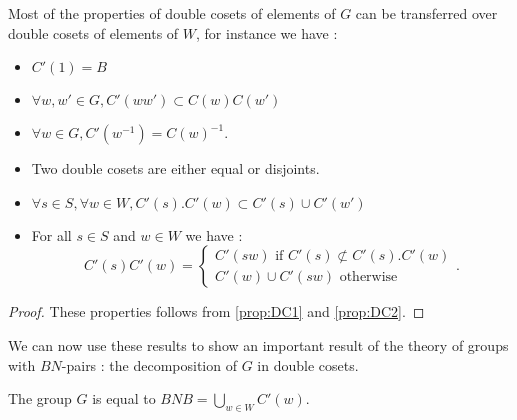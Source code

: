 Most of the properties of double cosets of elements of $G$ can be transferred over double cosets of elements of $W$, for instance we have : 

\begin{proprietes} \label{prop:DC3}
    \begin{itemize}
        \item  $C'\left( 1 \right) = B$
        \item $\forall w,w'\in G, C'\left( w w' \right) \subset C(w) C(w')$
        \item $\forall w \in G, C'\left( w^{-1} \right) = C\left( w \right)^{-1}$.
        \item Two double cosets are either equal or disjoints.
\item $\forall s \in S, \forall w \in W, C'(s). C'(w) \subset C'(s) \cup  C'(w')$
\item For all $s \in S$ and $w \in W$ we have :
     \[
     C'(s) C'(w) = \begin{cases}
         C'(sw) \text{ if } C'(s) \not \subset C'(s).C'(w)\\
         C'(w) \cup C'(sw) \text{ otherwise}
     \end{cases}
     .\] 
    \end{itemize}
\end{proprietes} 

\begin{proof}
    These properties follows from \ref{prop:DC1} and \ref{prop:DC2}.
\end{proof}

We can now use these results to show an important result of the theory of groups with $BN$-pairs : the decomposition of $G$ in double cosets.

\begin{theoreme} \label{thm:DCD}
    The group $G$ is equal to $B N B = \bigcup_{w \in W} C'\left( w \right)$.
\end{theoreme}

